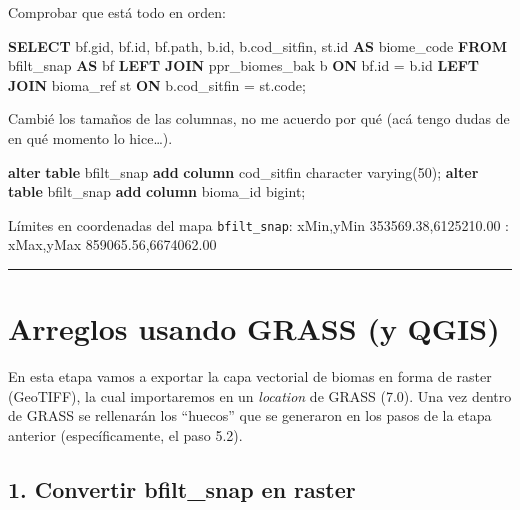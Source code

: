 \documentclass[spanish,]{article}
\newenvironment{Shaded}{}{}
\newcommand{\KeywordTok}[1]{\textcolor[rgb]{0.00,0.44,0.13}{\textbf{{#1}}}}
\newcommand{\DataTypeTok}[1]{\textcolor[rgb]{0.56,0.13,0.00}{{#1}}}
\newcommand{\DecValTok}[1]{\textcolor[rgb]{0.25,0.63,0.44}{{#1}}}
\newcommand{\NormalTok}[1]{{#1}}
\begin{document}
Comprobar que está todo en orden:

\begin{Shaded}
\begin{Highlighting}[]
\KeywordTok{SELECT} \NormalTok{bf.gid, bf.id, bf.path, b.id, b.cod_sitfin, st.id }\KeywordTok{AS} \NormalTok{biome_code }
  \KeywordTok{FROM} \NormalTok{bfilt_snap }\KeywordTok{AS} \NormalTok{bf }
  \KeywordTok{LEFT} \KeywordTok{JOIN} \NormalTok{ppr_biomes_bak b }\KeywordTok{ON} \NormalTok{bf.id = b.id}
  \KeywordTok{LEFT} \KeywordTok{JOIN} \NormalTok{bioma_ref st }\KeywordTok{ON} \NormalTok{b.cod_sitfin = st.code;}
\end{Highlighting}
\end{Shaded}

Cambié los tamaños de las columnas, no me acuerdo por qué (acá tengo
dudas de en qué momento lo hice\ldots{}).

\begin{Shaded}
\begin{Highlighting}[]
\KeywordTok{alter} \KeywordTok{table} \NormalTok{bfilt_snap }\KeywordTok{add} \KeywordTok{column} \NormalTok{cod_sitfin }\DataTypeTok{character} \DataTypeTok{varying}\NormalTok{(}\DecValTok{50}\NormalTok{);}
\KeywordTok{alter} \KeywordTok{table} \NormalTok{bfilt_snap }\KeywordTok{add} \KeywordTok{column} \NormalTok{bioma_id bigint;}
\end{Highlighting}
\end{Shaded}

Límites en coordenadas del mapa \texttt{bfilt\_snap}: xMin,yMin
353569.38,6125210.00 : xMax,yMax 859065.56,6674062.00

\begin{center}\rule{0.5\linewidth}{\linethickness}\end{center}

\section{Arreglos usando GRASS (y
QGIS)}\label{arreglos-usando-grass-y-qgis}

En esta etapa vamos a exportar la capa vectorial de biomas en forma de
raster (GeoTIFF), la cual importaremos en un \emph{location} de GRASS
(7.0). Una vez dentro de GRASS se rellenarán los ``huecos'' que se
generaron en los pasos de la etapa anterior (específicamente, el paso
5.2).

\subsection{1. Convertir bfilt\_snap en
raster}\label{convertir-bfiltux5fsnap-en-raster}
\end{document}
